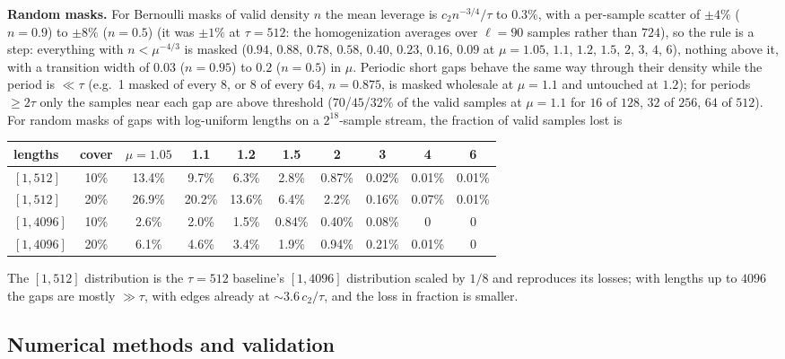 \documentclass{article}
\numberwithin{equation}{section}   %
\begin{document}
{\bf Random masks.}  For Bernoulli masks of valid density $n$ the mean leverage is $c_2 n^{-3/4}/\tau$
to $0.3\%$, with a per-sample scatter of $\pm 4\%$ ($n = 0.9$) to $\pm 8\%$ ($n = 0.5$) (it was $\pm 1\%$
at $\tau = 512$: the homogenization averages over $\ell = 90$ samples rather than $724$), so the rule is a
step: everything with $n < \mu^{-4/3}$ is masked ($0.94$, $0.88$, $0.78$, $0.58$, $0.40$, $0.23$, $0.16$,
$0.09$ at $\mu = 1.05$, $1.1$, $1.2$, $1.5$, $2$, $3$, $4$, $6$), nothing above it, with a transition
width of $0.03$ ($n = 0.95$) to $0.2$ ($n = 0.5$) in $\mu$.  Periodic short gaps behave the same way
through their density while the period is $\ll \tau$ (e.g.\ 1 masked of every 8, or 8 of every 64,
$n = 0.875$, is masked wholesale at $\mu = 1.1$ and untouched at $1.2$); for periods $\ge 2\tau$ only the
samples near each gap are above threshold ($70$/$45$/$32\%$ of the valid samples at $\mu = 1.1$ for
$16$ of $128$, $32$ of $256$, $64$ of $512$).  For random masks of gaps with log-uniform lengths on a
$2^{18}$-sample stream, the fraction of valid samples lost is
\begin{center}\small
\begin{tabular}{lccccccccc}
\toprule
lengths & cover & $\mu = 1.05$ & 1.1 & 1.2 & 1.5 & 2 & 3 & 4 & 6 \\
\midrule
$[1, 512]$  & 10\% & 13.4\% & 9.7\% & 6.3\% & 2.8\% & 0.87\% & 0.02\% & 0.01\% & 0.01\% \\
$[1, 512]$  & 20\% & 26.9\% & 20.2\% & 13.6\% & 6.4\% & 2.2\% & 0.16\% & 0.07\% & 0.01\% \\
$[1, 4096]$ & 10\% & 2.6\% & 2.0\% & 1.5\% & 0.84\% & 0.40\% & 0.08\% & 0 & 0 \\
$[1, 4096]$ & 20\% & 6.1\% & 4.6\% & 3.4\% & 1.9\% & 0.94\% & 0.21\% & 0.01\% & 0 \\
\bottomrule
\end{tabular}
\end{center}
The $[1, 512]$ distribution is the $\tau = 512$ baseline's $[1, 4096]$ distribution scaled by $1/8$ and
reproduces its losses; with lengths up to $4096$ the gaps are mostly $\gg \tau$, with edges already at
$\sim 3.6\,c_2/\tau$, and the loss in fraction is smaller.

\subsection{Numerical methods and validation}
\label{sec:ip_numerics}
\end{document}

